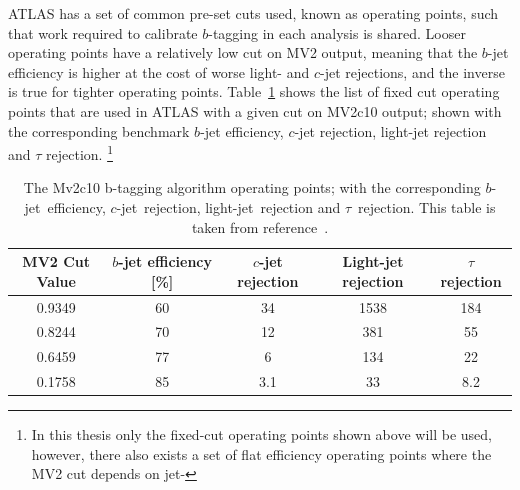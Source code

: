 ATLAS has a set of common pre-set cuts used, known as operating points, such that work required to calibrate $b$-tagging in each analysis is shared.
Looser operating points have a relatively low cut on MV2 output, meaning that the $b$-jet efficiency is higher at the cost of worse light- and $c$-jet rejections,
and the inverse is true for tighter operating points.
Table~\ref{tab:obj-MV2_WPs} shows the list of fixed cut operating points that are used in ATLAS with a given cut on MV2c10 output;
shown with the corresponding benchmark $b$-jet efficiency, $c$-jet rejection, light-jet rejection and $\tau$ rejection.
\footnote{In this thesis only the fixed-cut operating points shown above will be used,
  however, there also exists a set of flat efficiency operating points where the MV2 cut depends on jet-\pT}
\begin{table}[!htb]
  \begin{center}
    \begin{tabular}{|c||c|c|c|c|}
      \hline
      MV2 Cut Value  &  $b$-jet efficiency [\%]  &     $c$-jet rejection   &   Light-jet rejection  &    $\tau$ rejection  \\
      \hline
      0.9349         &           60              &           34          &      1538              &     184              \\
      0.8244         &           70              &           12          &       381              &      55              \\
      0.6459         &           77              &           6           &       134              &      22              \\
      0.1758         &           85              &           3.1         &        33              &     8.2              \\
      \hline
    \end{tabular}
    \caption[The Mv2c10 b-tagging algorithm operating points; with the corresponding $b$-jet~efficiency, $c$-jet~rejection, light-jet~rejection and $\tau$~rejection.]
            {The Mv2c10 b-tagging algorithm operating points; with the corresponding $b$-jet~efficiency, $c$-jet~rejection, light-jet~rejection and $\tau$~rejection.
              This table is taken from reference~\cite{obj-bjets_algo_2016}.}
            \label{tab:obj-MV2_WPs}
  \end{center}
  \vspace{-1cm}
\end{table}

